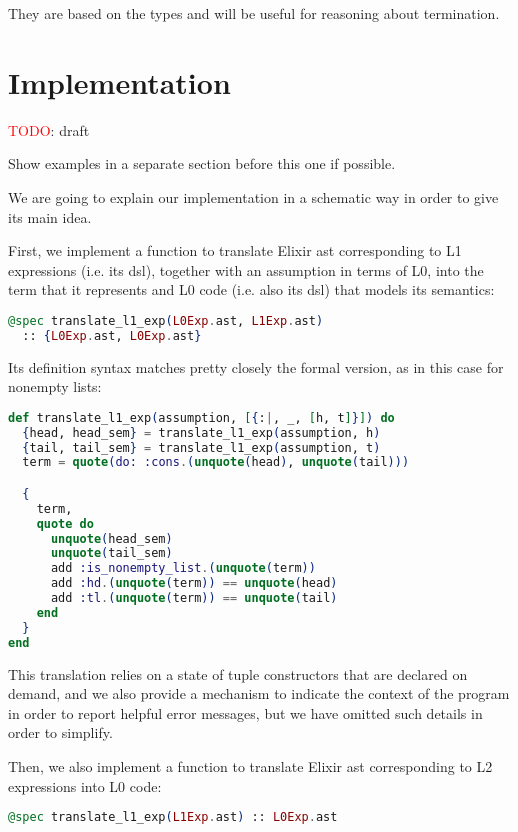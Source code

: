 They are based on the types and will be useful for reasoning about termination.

\section{Implementation}

\textcolor{red}{TODO}: draft

Show examples in a separate section before this one if possible.

We are going to explain our implementation in a schematic way in order to give its 
main idea. 

First, we implement a function to translate Elixir \gls{ast} corresponding
to L1 expressions (i.e. its \gls{dsl}), together with an assumption in terms of L0, 
into the term that it represents and L0 code (i.e. also its \gls{dsl}) that models 
its semantics:

\begin{lstlisting}[language=elixir,numbers=none,frame=none]
@spec translate_l1_exp(L0Exp.ast, L1Exp.ast) 
  :: {L0Exp.ast, L0Exp.ast}
\end{lstlisting}

Its definition syntax matches pretty closely the formal version, as in this 
case for nonempty lists:

\begin{lstlisting}[language=elixir,numbers=none,frame=none]
def translate_l1_exp(assumption, [{:|, _, [h, t]}]) do
  {head, head_sem} = translate_l1_exp(assumption, h)
  {tail, tail_sem} = translate_l1_exp(assumption, t)
  term = quote(do: :cons.(unquote(head), unquote(tail)))

  {
    term,
    quote do
      unquote(head_sem)
      unquote(tail_sem)
      add :is_nonempty_list.(unquote(term))
      add :hd.(unquote(term)) == unquote(head)
      add :tl.(unquote(term)) == unquote(tail)
    end
  }
end
\end{lstlisting}

This translation relies on a state of tuple constructors that are declared on 
demand, and we also provide a mechanism to indicate the context of the program 
in order to report helpful error messages, but we have omitted such details in 
order to simplify.

Then, we also implement a function to translate Elixir \gls{ast} corresponding
to L2 expressions into L0 code:

\begin{lstlisting}[language=elixir,numbers=none,frame=none]
@spec translate_l1_exp(L1Exp.ast) :: L0Exp.ast
\end{lstlisting}

